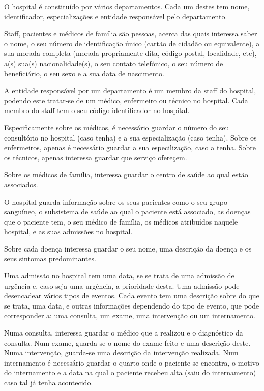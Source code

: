 \documentclass[article, a4paper, 12pt, oneside]{memoir}
\begin{document}
O hospital é constituído por vários departamentos. Cada um destes tem nome, identificador, especializações e entidade responsável pelo departamento.

Staff, pacientes e médicos de família são pessoas, acerca das quais interessa saber o nome, o seu número de identificação único (cartão de cidadão ou equivalente), a sua morada completa (morada propriamente dita, código postal, localidade, etc), a(s) sua(s) nacionalidade(s), o seu contato telefónico, o seu número de beneficiário, o seu sexo e a sua data de nascimento.

A entidade responsável por um departamento é um membro da staff do hospital, podendo este tratar-se de um médico, enfermeiro ou técnico no hospital. Cada membro do staff tem o seu código identificador no hospital.

Especificamente sobre os médicos, é necessário guardar o número do seu consultório no hospital (caso tenha) e a sua especialização (caso tenha).
Sobre os enfermeiros, apenas é necessário guardar a sua especilização, caso a tenha.
Sobre os técnicos, apenas interessa guardar que serviço ofereçem.

Sobre os médicos de família, interessa guardar o centro de saúde ao qual estão associados.

O hospital guarda informação sobre os seus pacientes como o seu grupo sanguíneo, o subsistema de saúde ao qual o paciente está associado, as doenças que o paciente tem, o seu médico de família, os médicos atribuídos naquele hospital, e as suas admissões no hospital.

Sobre cada doença interessa guardar o seu nome, uma descrição da doença e os seus sintomas predominantes.

Uma admissão no hospital tem uma data, se se trata de uma admissão de urgência e, caso seja uma urgência, a prioridade desta. Uma admissão pode desencadear vários tipos de eventos. Cada evento tem uma descrição sobre do que se trata, uma data, e outras informações dependendo do tipo de evento, que pode corresponder a: uma consulta, um exame, uma intervenção ou um internamento.

Numa consulta, interessa guardar o médico que a realizou e o diagnóstico da consulta.
Num exame, guarda-se o nome do exame feito e uma descrição deste.
Numa intervenção, guarda-se uma descrição da intervenção realizada.
Num internamento é necessário guardar o quarto onde o paciente se encontra, o motivo do internamento e a data na qual o paciente recebeu alta (saiu do internamento) caso tal já tenha acontecido.
\end{document}
